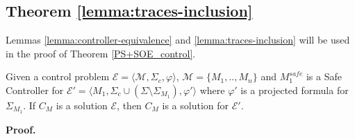 \newpage
\subsection{Theorem \ref{lemma:traces-inclusion} }
\noindent Lemmas \ref{lemma:controller-equivalence} and \ref{lemma:traces-inclusion} will be used in the proof of Theorem \ref{PS+SOE_control}.
\begin{lemma}
    \label{lemma:controller-equivalence}
    Given a control problem $\mathcal{E} =  \langle \mathcal{M}, \Sigma_c, \varphi \rangle$, $\mathcal{M} = \{M_1, .., M_n\}$ and $M_{1}^{safe}$ is a Safe Controller for $\mathcal{E'} = \langle M_1, \Sigma_c \cup (\Sigma \setminus \Sigma_{M_1}), \varphi' \rangle$ where $\varphi'$ is a projected formula for $\Sigma_{M_1}$. If $C_M$ is a solution $\mathcal{E}$, then $C_M$ is a solution for $\mathcal{E'}$. 
\end{lemma}
\textbf{Proof.} \\
